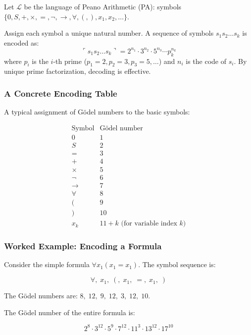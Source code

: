 Let $\mathcal{L}$ be the language of Peano Arithmetic (PA): symbols $\{0, S, +, \times, =, \neg, \to, \forall, (, ), x_1, x_2, \dots\}$.

\begin{definition}
Assign each symbol a unique natural number. A sequence of symbols $s_1 s_2 \dots s_k$ is encoded as:
\[
\ulcorner s_1 s_2 \dots s_k \urcorner = 2^{n_1} \cdot 3^{n_2} \cdot 5^{n_3} \cdots p_k^{n_k}
\]
where $p_i$ is the $i$-th prime ($p_1 = 2, p_2 = 3, p_3 = 5, \dots$) and $n_i$ is the code of $s_i$. By unique prime factorization, decoding is effective.
\end{definition}

\subsubsection*{A Concrete Encoding Table}

A typical assignment of Gödel numbers to the basic symbols:

\[
\begin{array}{c|c}
\text{Symbol} & \text{Gödel number} \\ \hline
0 & 1 \\
S & 2 \\
= & 3 \\
+ & 4 \\
\times & 5 \\
\neg & 6 \\
\to & 7 \\
\forall & 8 \\
( & 9 \\
) & 10 \\
x_k & 11 + k \text{ (for variable index } k \text{)}
\end{array}
\]

\subsubsection*{Worked Example: Encoding a Formula}

Consider the simple formula $\forall x_1 (x_1 = x_1)$. The symbol sequence is:

\[
\forall,\; x_1,\; (,\; x_1,\; =,\; x_1,\; )
\]

The Gödel numbers are: $8,\; 12,\; 9,\; 12,\; 3,\; 12,\; 10$.

The Gödel number of the entire formula is:

\[
2^{8} \cdot 3^{12} \cdot 5^{9} \cdot 7^{12} \cdot 11^{3} \cdot 13^{12} \cdot 17^{10}
\]


